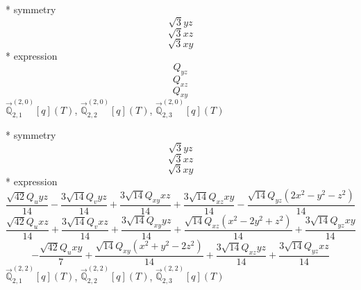 \documentclass[fleqn,8pt]{jsarticle}
\begin{document}
\noindent\quad ** symmetry
\begin{dmath*}
\sqrt{3} y z
\end{dmath*}
\begin{dmath*}
\sqrt{3} x z
\end{dmath*}
\begin{dmath*}
\sqrt{3} x y
\end{dmath*}
\noindent\quad ** expression
\begin{dmath*}
Q_{yz}
\end{dmath*}
\begin{dmath*}
Q_{xz}
\end{dmath*}
\begin{dmath*}
Q_{xy}
\end{dmath*}
\noindent\quad $\vec{\mathbb{Q}}_{2,1}^{(2,0)}[q](T)$, $\vec{\mathbb{Q}}_{2,2}^{(2,0)}[q](T)$, $\vec{\mathbb{Q}}_{2,3}^{(2,0)}[q](T)$

\noindent\quad ** symmetry
\begin{dmath*}
\sqrt{3} y z
\end{dmath*}
\begin{dmath*}
\sqrt{3} x z
\end{dmath*}
\begin{dmath*}
\sqrt{3} x y
\end{dmath*}
\noindent\quad ** expression
\begin{dmath*}
\frac{\sqrt{42} Q_{u} y z}{14} - \frac{3 \sqrt{14} Q_{v} y z}{14} + \frac{3 \sqrt{14} Q_{xy} x z}{14} + \frac{3 \sqrt{14} Q_{xz} x y}{14} - \frac{\sqrt{14} Q_{yz} \left(2 x^{2} - y^{2} - z^{2}\right)}{14}
\end{dmath*}
\begin{dmath*}
\frac{\sqrt{42} Q_{u} x z}{14} + \frac{3 \sqrt{14} Q_{v} x z}{14} + \frac{3 \sqrt{14} Q_{xy} y z}{14} + \frac{\sqrt{14} Q_{xz} \left(x^{2} - 2 y^{2} + z^{2}\right)}{14} + \frac{3 \sqrt{14} Q_{yz} x y}{14}
\end{dmath*}
\begin{dmath*}
- \frac{\sqrt{42} Q_{u} x y}{7} + \frac{\sqrt{14} Q_{xy} \left(x^{2} + y^{2} - 2 z^{2}\right)}{14} + \frac{3 \sqrt{14} Q_{xz} y z}{14} + \frac{3 \sqrt{14} Q_{yz} x z}{14}
\end{dmath*}
\noindent\quad $\vec{\mathbb{Q}}_{2,1}^{(2,2)}[q](T)$, $\vec{\mathbb{Q}}_{2,2}^{(2,2)}[q](T)$, $\vec{\mathbb{Q}}_{2,3}^{(2,2)}[q](T)$
\end{document}
